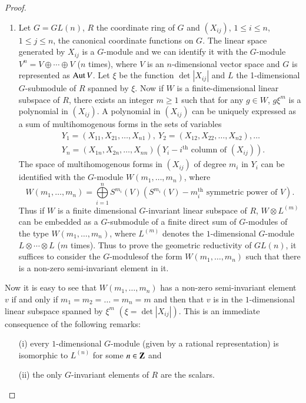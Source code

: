 \begin{proof}
\begin{enumerate}
\item Let $G=GL(n)$, $R$ the coordinate ring of $G$ and $(X_{ij})$, $1\leq i\leq n$, $1\leq j\leq n$, the canonical coordinate functions on $G$. The linear space generated by $X_{ij}$ is a $G$-module and we can identify it with the $G$-module $V^{n}=V\oplus\cdots\oplus V$ ($n$ times), where $V$ is an $n$-dimensional vector space and $G$ is represented as $\operatorname{\mathrm{Aut}} V$. Let $\xi$ be the function $\det |X_{ij}|$ and $L$ the 1-dimensional $G$-submodule of $R$ spanned by $\xi$. Now if $W$ is a finite-dimensional linear subspace of $R$, there exists an integer $m\geq 1$ such that for any $g\in W$, $g\xi^{m}$ is a polynomial in $(X_{ij})$. A polynomial in $(X_{ij})$ can be uniquely expressed as a sum of multihomogenous forms in the sets of variables
\begin{align*}
& Y_{1}=(X_{11},X_{21},\ldots,X_{n1}), \ Y_{2}=(X_{12},X_{22},\ldots,X_{n2}),\ldots\\
& Y_{n}=(X_{1n},X_{2n},\ldots,X_{nn})(Y_{i}-i^{\text{th}}\text{~column of~}(X_{ij})).
\end{align*}
The space of multihomogenous forms in $(X_{ij})$ of degree $m_{i}$ in $Y_{i}$ can be identified with the $G$-module $W(m_{1},\ldots,m_{n})$, where
$$
W(m_{1},\ldots,m_{n})=\bigoplus\limits^{n}_{i=1}S^{m_{i}}(V)(S^{m_{i}}(V)-m^{\text{th}}_{i}\text{~symmetric power of } V).
$$
Thus if $W$ is a finite dimensional $G$-invariant linear subspace of $R$, $W\otimes L^{(m)}$ can be embedded as a $G$-submodule of a finite direct sum of $G$-modules of the type $W(m_{1},\ldots,m_{n})$, where $L^{(m)}$ denotes the $1$-dimensional $G$-module $L\otimes\cdots\otimes L$ ($m$ times). Thus to prove the geometric reductivity of $GL(n)$, it suffices to consider the $G$-modules\pageoriginale of the form $W(m_{1},\ldots,m_{n})$ such that there is a non-zero semi-invariant element in it.
\end{enumerate}

Now it is easy to see that $W(m_{1},\ldots,m_{n})$ has a non-zero semi-invariant element $v$ if and only if $m_{1}=m_{2}=\ldots=m_{n}=m$ and then that $v$ is in the $1$-dimensional linear subspace spanned by $\xi^{m}$ $(\xi=\det |X_{ij}|)$. This is an immediate consequence of the following remarks:
\begin{itemize}
\item[(i)] every $1$-dimensional $G$-module (given by a rational representation) is isomorphic to $L^{(n)}$ for some $n\in \mathbf{Z}$ and

\item[(ii)] the only $G$-invariant elements of $R$ are the scalars.
 

\end{itemize}
\end{proof}
